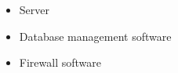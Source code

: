 \begin{itemize}
	\item Server
	\item Database management software 
	\item Firewall software
\end{itemize}

